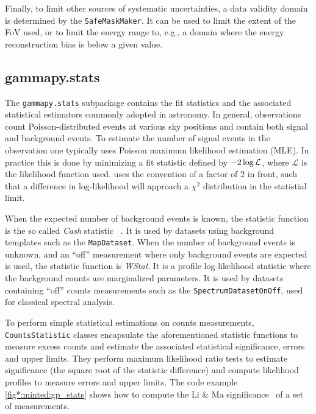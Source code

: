 \documentclass[longauth]{aa}
\newcommand{\code}[1]{\texttt{#1}}
\begin{document}
Finally, to limit other sources of systematic uncertainties, a data validity
domain is determined by the \code{SafeMaskMaker}. It can be used to limit the
extent of the FoV used, or to limit the energy range to, e.g., a domain
where the energy reconstruction bias is below a given value.


\subsection{gammapy.stats}
\label{ssec:gammapy-stats}
The \code{gammapy.stats} subpackage contains the fit statistics and the associated
statistical estimators commonly adopted in \gammaray astronomy. In
general, \gammaray observations count Poisson-distributed events at various sky
positions and contain both signal and background events.
To estimate the number of signal events in the observation one typically uses
Poisson maximum likelihood estimation (MLE). In practice this is done
by minimizing a fit statistic defined by $-2 \time\cdot \log{\mathcal{L}}$,
where $\mathcal{L}$ is the likelihood function used. \gammapy uses the convention
of a factor of 2 in front, such that a difference in log-likelihood will
approach a $\chi^2$ distribution in the statistial limit.

When the expected number of background events is known, the statistic function 
is the so called \emph{Cash} statistic ~\citep{Cash}. It is used by datasets using background
templates such as the
\code{MapDataset}. When the number of background events is unknown, and an \enquote{off}
measurement where only background events are expected is used, the statistic
function is \emph{WStat}. It is a profile log-likelihood statistic where the background
counts are marginalized parameters. It is used by datasets containing \enquote{off}
counts measurements such as the \code{SpectrumDatasetOnOff}, used for classical
spectral analysis.

To perform simple statistical estimations on counts measurements,
\code{CountsStatistic} classes encapsulate the aforementioned statistic functions to
measure excess counts and estimate the associated statistical significance,
errors and upper limits. They perform maximum likelihood ratio tests to
estimate significance (the square root of the statistic difference) and compute
likelihood profiles to measure errors and upper limits. The code example
\ref{fig*:minted:gp_stats} shows how to compute the Li \& Ma
significance~\citep{LiMa} of a set of measurements.
\end{document}
